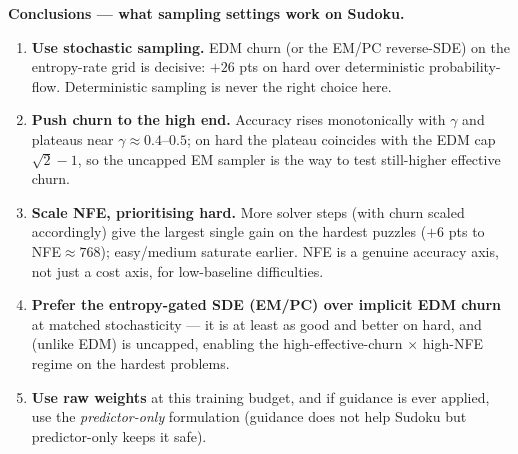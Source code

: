 \documentclass[10pt]{article}
\begin{document}
\normalsize
\textbf{Conclusions --- what sampling settings work on Sudoku.}
\begin{enumerate}\setlength\itemsep{1pt}
\item \textbf{Use stochastic sampling.} EDM churn (or the EM/PC reverse-SDE) on the entropy-rate
grid is decisive: $+26$ pts on hard over deterministic probability-flow. Deterministic sampling is
never the right choice here.
\item \textbf{Push churn to the high end.} Accuracy rises monotonically with $\gamma$ and plateaus
near $\gamma{\approx}0.4$--$0.5$; on hard the plateau coincides with the EDM cap $\sqrt2-1$, so the
uncapped EM sampler is the way to test still-higher effective churn.
\item \textbf{Scale NFE, prioritising hard.} More solver steps (with churn scaled accordingly) give
the largest single gain on the hardest puzzles ($+6$ pts to NFE${\approx}768$); easy/medium saturate
earlier. NFE is a genuine accuracy axis, not just a cost axis, for low-baseline difficulties.
\item \textbf{Prefer the entropy-gated SDE (EM/PC) over implicit EDM churn} at matched stochasticity
--- it is at least as good and better on hard, and (unlike EDM) is uncapped, enabling the
high-effective-churn $\times$ high-NFE regime on the hardest problems.
\item \textbf{Use raw weights} at this training budget, and if guidance is ever applied, use the
\emph{predictor-only} formulation (guidance does not help Sudoku but predictor-only keeps it safe).
\end{enumerate}
\end{document}
